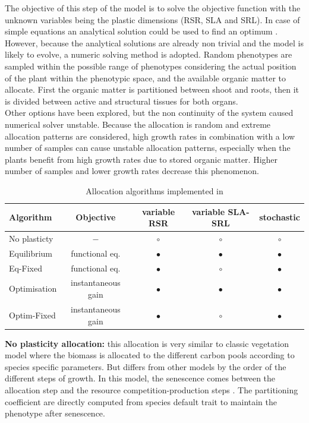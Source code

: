\indent The objective of this step of the model is to solve the objective function with the unknown variables being the plastic dimensions (RSR, SLA and SRL). In case of simple equations an analytical solution could be used to find an optimum . However, because the analytical solutions are already non trivial and the model is likely to evolve, a numeric solving method is adopted. Random phenotypes are sampled within the possible range of phenotypes considering the actual position of the plant within the phenotypic space, and the available organic matter to allocate. First the organic matter is partitioned between shoot and roots, then it is divided between active and structural tissues for both organs.\\
Other options have been explored, but the non continuity of the system caused numerical solver unstable. Because the allocation is random and extreme allocation patterns are considered, high growth rates in combination with a low number of samples can cause unstable allocation patterns, especially when the plants benefit from high growth rates due to stored organic matter. Higher number of samples and lower growth rates decrease this phenomenon.

\begin{table}
\caption{Allocation algorithms implemented in \model} 
\label{table:alloc_algo}
\begin{tabular}{l|c|c c c}
Algorithm & Objective & variable RSR & variable SLA-SRL & stochastic \\ 
\hline 
No plasticty & $-$ & $\circ$ & $\circ$ & $\circ$ \\
Equilibrium & functional eq. & $\bullet$ & $\bullet$ & $\bullet$ \\
Eq-Fixed & functional eq. & $\bullet$ & $\circ$ & $\bullet$ \\
Optimisation & instantaneous gain & $\bullet$ & $\bullet$ & $\bullet$ \\
Optim-Fixed & instantaneous gain & $\bullet$ & $\circ$ & $\bullet$ \\
\end{tabular} 
\vspace*{0.5cm}
\end{table}

\textbf{No plasticity allocation:} this allocation is very similar to classic vegetation model where the biomass is allocated to the different carbon pools according to species specific parameters. But \model differs from other models by the order of the different steps of growth. In this model, the senescence comes between the allocation step and the resource competition-production steps . The partitioning coefficient are directly computed from species default trait to maintain the phenotype after senescence.


